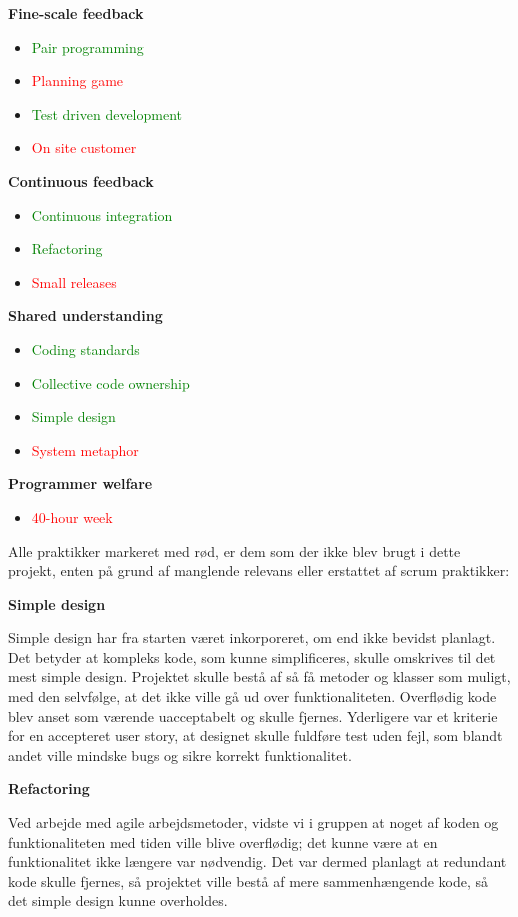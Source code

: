 \documentclass[11pt]{report}
\begin{document}
\noindent\textbf{Fine-scale feedback}
\begin{itemize}
  \item \textcolor{green}{Pair programming}
  \item \textcolor{red}{Planning game}
  \item \textcolor{green}{Test driven development}
  \item \textcolor{red}{On site customer}
\end{itemize}
\textbf{Continuous feedback}
\begin{itemize}
  \item \textcolor{green}{Continuous integration}
  \item \textcolor{green}{Refactoring}
  \item \textcolor{red}{Small releases}
\end{itemize}
\newpage
\noindent\textbf{Shared understanding}
\begin{itemize}
  \item \textcolor{green}{Coding standards}
  \item \textcolor{green}{Collective code ownership}
  \item \textcolor{green}{Simple design}
  \item \textcolor{red}{System metaphor}
\end{itemize}
\textbf{Programmer welfare}
\begin{itemize}
  \item \textcolor{red}{40-hour week}
\end{itemize}

\noindent Alle praktikker markeret med rød, er dem som der ikke blev brugt i dette projekt, enten på grund af manglende relevans eller erstattet af scrum praktikker: 

\noindent\textbf{Simple design}

Simple design har fra starten været inkorporeret, om end ikke bevidst planlagt. Det betyder at kompleks kode, som kunne simplificeres, skulle omskrives til det mest simple design. Projektet skulle bestå af så få metoder og klasser som muligt, med den selvfølge, at det ikke ville gå ud over funktionaliteten. Overflødig kode blev anset som værende uacceptabelt og skulle fjernes. Yderligere var et kriterie for en accepteret user story, at designet skulle fuldføre test uden fejl, som blandt andet ville mindske bugs og sikre korrekt funktionalitet.

\noindent\textbf{Refactoring}

Ved arbejde med agile arbejdsmetoder, vidste vi i gruppen at noget af koden og funktionaliteten med tiden ville blive overflødig; det kunne være at en funktionalitet ikke længere var nødvendig. Det var dermed planlagt at redundant kode skulle fjernes, så projektet ville bestå af mere sammenhængende kode, så det simple design kunne overholdes.
\end{document}
